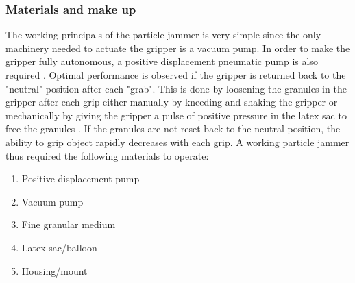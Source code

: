 \documentclass[11pt]{article}
\begin{document}
\subsubsection{Materials and make up}
The working principals of the particle jammer is very simple since the only machinery needed to actuate the gripper is a vacuum pump. In order to make the gripper fully autonomous, a positive displacement pneumatic pump is also required \cite{amend2012positive}. Optimal performance is observed if the gripper is returned back to the "neutral" position after each "grab". This is done by loosening the granules in the gripper after each grip either manually by kneeding and shaking the gripper or mechanically by giving the gripper a pulse of positive pressure in the latex sac to free the granules \cite{amend2012positive}. If the granules are not reset back to the neutral position, the ability to grip object rapidly decreases with each grip. A working particle jammer thus required the following materials to operate\cite{amend2012positive}:
\begin{enumerate}
\item Positive displacement pump
\item Vacuum pump
\item Fine granular medium
\item Latex sac/balloon
\item Housing/mount
\end{enumerate}
\end{document}
